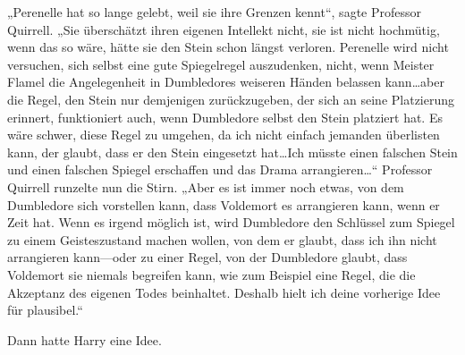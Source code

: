 „Perenelle hat so lange gelebt, weil sie ihre Grenzen kennt“, sagte Professor Quirrell. „Sie überschätzt ihren eigenen Intellekt nicht, sie ist nicht hochmütig, wenn das so wäre, hätte sie den Stein schon längst verloren. Perenelle wird nicht versuchen, sich selbst eine gute Spiegelregel auszudenken, nicht, wenn Meister Flamel die Angelegenheit in Dumbledores weiseren Händen belassen kann…aber die Regel, den Stein nur demjenigen zurückzugeben, der sich an seine Platzierung erinnert, funktioniert auch, wenn Dumbledore selbst den Stein platziert hat. Es wäre schwer, diese Regel zu umgehen, da ich nicht einfach jemanden überlisten kann, der glaubt, dass er den Stein eingesetzt hat…Ich müsste einen falschen Stein und einen falschen Spiegel erschaffen und das Drama arrangieren…“
Professor Quirrell runzelte nun die Stirn.
„Aber es ist immer noch etwas, von dem Dumbledore sich vorstellen kann, dass Voldemort es arrangieren kann, wenn er Zeit hat. Wenn es irgend möglich ist, wird Dumbledore den Schlüssel zum Spiegel zu einem Geisteszustand machen wollen, von dem er glaubt, dass ich ihn nicht arrangieren kann—oder zu einer Regel, von der Dumbledore glaubt, dass Voldemort sie niemals begreifen kann, wie zum Beispiel eine Regel, die die Akzeptanz des eigenen Todes beinhaltet. Deshalb hielt ich deine vorherige Idee für plausibel.“

Dann hatte Harry eine Idee.

